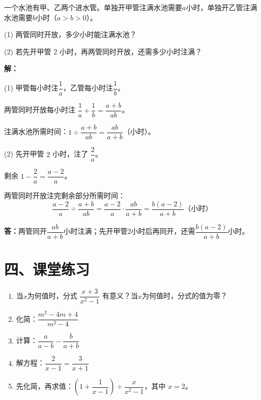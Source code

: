 \documentclass[12pt, a4paper]{ctexart}
\begin{document}
\begin{appbox}[【应用4】注水问题]
一个水池有甲、乙两个进水管。单独开甲管注满水池需要$a$小时，单独开乙管注满水池需要$b$小时（$a > b > 0$）。

(1) 两管同时开放，多少小时能注满水池？

(2) 若先开甲管 $2$ 小时，再两管同时开放，还需多少小时注满？

\bigskip
\textbf{解：}

(1) 甲管每小时注$\dfrac{1}{a}$，乙管每小时注$\dfrac{1}{b}$。

两管同时开放每小时注 $\dfrac{1}{a}+\dfrac{1}{b} = \dfrac{a+b}{ab}$。

注满水池所需时间：$1 \div \dfrac{a+b}{ab} = \dfrac{ab}{a+b}$（小时）。

(2) 先开甲管 $2$ 小时，注了 $\dfrac{2}{a}$。

剩余 $1 - \dfrac{2}{a} = \dfrac{a-2}{a}$。

两管同时开放注完剩余部分所需时间：
\[
\frac{a-2}{a} \div \frac{a+b}{ab} = \frac{a-2}{a} \cdot \frac{ab}{a+b} = \frac{b(a-2)}{a+b} \text{（小时）}
\]

\textbf{答：}两管同开$\dfrac{ab}{a+b}$小时注满；先开甲管$2$小时后再同开，还需$\dfrac{b(a-2)}{a+b}$小时。
\end{appbox}

\section*{\textcolor{tipgreen}{四、课堂练习}}

\begin{enumerate}[leftmargin=2em]
  \item 当$x$为何值时，分式 $\dfrac{x+3}{x^2 - 1}$ 有意义？当$x$为何值时，分式的值为零？

  \item 化简：$\dfrac{m^2 - 4m + 4}{m^2 - 4}$

  \item 计算：$\dfrac{a}{a-b} - \dfrac{b}{a+b}$

  \item 解方程：$\dfrac{2}{x-1} = \dfrac{3}{x+1}$

  \item 先化简，再求值：$\left(1 + \dfrac{1}{x-1}\right) \div \dfrac{x}{x^2 - 1}$，其中 $x = 2$。
\end{enumerate}
\end{document}
